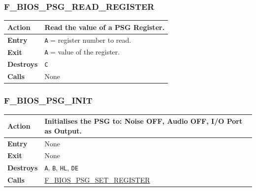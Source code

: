 \documentclass[a4paper,11pt]{article}
\begin{document}
        \subsubsection{F\_BIOS\_PSG\_READ\_REGISTER}
        \label{func:fbiospsgreadregister}
        \begin{tabular}{l p{9cm}}
            \hline\textbf{Action}
            & Read the value of a PSG Register. \\
            \hline\textbf{Entry} & \texttt{A} = register number to read.\\
            \hline\textbf{Exit} & \texttt{A} = value of the register.\\
            \hline\textbf{Destroys} & \texttt{C} \\
            \hline\textbf{Calls} & None\\
            \hline
        \end{tabular}

        \subsubsection{F\_BIOS\_PSG\_INIT}
        \label{func:fbiospsginit}
        \begin{tabular}{l p{9cm}}
            \hline\textbf{Action}
            & Initialises the PSG to: Noise OFF, Audio OFF, I/O Port as Output. \\
            \hline\textbf{Entry} & None\\
            \hline\textbf{Exit} & None\\
            \hline\textbf{Destroys} & \texttt{A}, \texttt{B}, \texttt{HL},
            \texttt{DE} \\
            \hline\textbf{Calls} & \hyperref[func:fbiospsgsetregister]
            {F\_BIOS\_PSG\_SET\_REGISTER}\\
            \hline
        \end{tabular}

\end{document}
